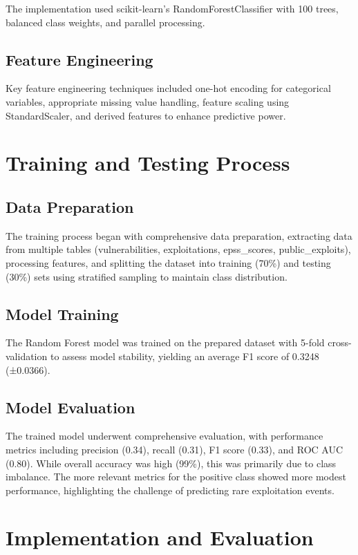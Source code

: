 \documentclass[runningheads]{llncs}
\begin{document}
The implementation used scikit-learn's RandomForestClassifier with 100 trees, balanced class weights, and parallel processing.

\subsection{Feature Engineering}
Key feature engineering techniques included one-hot encoding for categorical variables, appropriate missing value handling, feature scaling using StandardScaler, and derived features to enhance predictive power.

\section{Training and Testing Process}
\label{sec:training_testing}

\subsection{Data Preparation}
The training process began with comprehensive data preparation, extracting data from multiple tables (vulnerabilities, exploitations, epss\_scores, public\_exploits), processing features, and splitting the dataset into training (70\%) and testing (30\%) sets using stratified sampling to maintain class distribution.

\subsection{Model Training}
The Random Forest model was trained on the prepared dataset with 5-fold cross-validation to assess model stability, yielding an average F1 score of 0.3248 (±0.0366).

\subsection{Model Evaluation}
The trained model underwent comprehensive evaluation, with performance metrics including precision (0.34), recall (0.31), F1 score (0.33), and ROC AUC (0.80). While overall accuracy was high (99\%), this was primarily due to class imbalance. The more relevant metrics for the positive class showed more modest performance, highlighting the challenge of predicting rare exploitation events.

\section{Implementation and Evaluation}
\label{sec:implementation_evaluation}
\end{document}
